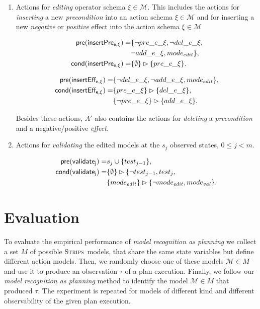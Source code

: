 \documentclass[letterpaper]{article} %
\newcommand{\pre}{\mathsf{pre}}     %
\newcommand{\cond}{\mathsf{cond}}   %
\newcommand{\strips}{\textsc{Strips}}     %
\begin{document}
\begin{itemize}
\begin{enumerate}
\item Actions for {\em editing} operator schema $\xi\in\mathcal{M}$. This includes the actions for {\em inserting} a new {\em precondition} into an action schema $\xi\in\mathcal{M}$ and for inserting a new {\em negative} or {\em positive} effect into the action schema $\xi\in\mathcal{M}$
\begin{small}
\begin{align*}
\hspace*{7pt}\pre(\mathsf{insertPre_{e,\xi}})=&\{\neg pre\_e\_\xi, \neg del\_e\_\xi,\\
& \neg add\_e\_\xi, mode_{edit}\},\\
\cond(\mathsf{insertPre_{e,\xi}})=&\{\emptyset\}\rhd\{pre\_e\_\xi\}.
\end{align*}
\end{small}
\begin{small}
\begin{align*}
\hspace*{7pt}\pre(\mathsf{insertEff_{e,\xi}})=&\{\neg del\_e\_\xi, \neg add\_e\_\xi,mode_{edit}\},\\
\cond(\mathsf{insertEff_{e,\xi}})=&\{pre\_e\_\xi\}\rhd\{del\_e\_\xi\},\\
&\{\neg pre\_e\_\xi\}\rhd\{add\_e\_\xi\}.
\end{align*}
\end{small}
Besides these actions, $A'$ also contains the actions for {\em deleting} a {\em precondition} and a negative/positive {\em effect}.

\item Actions for {\em validating} the edited models at the $s_j$ observed states, {\tt\small $0\leq j< m$}.
\begin{small}
\begin{align*}
\hspace*{7pt}\pre(\mathsf{validate_{j}})=&s_j\cup\{test_{j-1}\},\\
\cond(\mathsf{validate_{j}})=&\{\emptyset\}\rhd\{\neg test_{j-1}, test_j,\\
                            &\{mode_{edit}\}\rhd\{\neg mode_{edit}, mode_{val}\}.
\end{align*}
\end{small}
\end{enumerate}
\end{itemize}


\section{Evaluation}
\label{sec:evaluation}
To evaluate the empirical performance of {\em model recognition as planning} we collect a set $M$ of possible \strips\ models, that share the same state variables but define different action models. Then, we randomly choose one of these models $\mathcal{M}\in M$ and use it to produce an observation $\tau$ of a plan execution. Finally, we follow our {\em model recognition as planning} method to identify the model $\mathcal{M}\in M$ that produced $\tau$. The experiment is repeated for models of different kind and different observability of the given plan execution.
\end{document}
